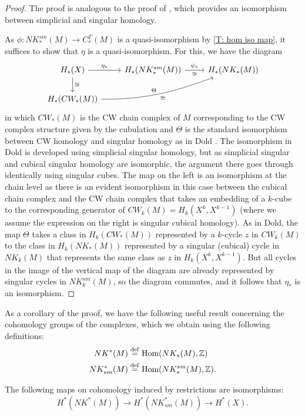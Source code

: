 \begin{proof}
	The proof is analogous to the proof of \cite[Proposition V.8.3]{Dol72}, which provides an isomorphism between simplicial and singular homology.

	As $\phi \colon NK^{sm}_*(M) \to C^\Gamma_*(M)$ is a quasi-isomorphism by \cref{T: hom iso map}, it suffices to show that $\eta$ is a quasi-isomorphism.
	For this, we have the diagram
	\[
	\begin{tikzcd}
		H_*(X) \arrow[r, "\eta_*"] \arrow[d, "\cong"] & H_*(NK^{sm}_*(M)) \arrow[r, "\psi_*", "\cong"'] & H_*(NK_*(M)) \\
		H_*(CW_*(M)) \arrow[rru, "\Theta", "\cong"', out=0, in=200] & &
	\end{tikzcd}
	\]
	in which $CW_*(M)$ is the CW chain complex of $M$ corresponding to the CW complex structure given by the cubulation and $\Theta$ is the standard isomorphism between CW homology and singular homology as in Dold \cite[Proposition V.1.9]{Dol72}.
	The isomorphism in Dold is developed using simplicial singular homology, but as simplicial singular and cubical singular homology are isomorphic, the argument there goes through identically using singular cubes.
	The map on the left is an isomorphism at the chain level as there is an evident isomorphism in this case between the cubical chain complex and the CW chain complex that takes an embedding of a $k$-cube to the corresponding generator of $CW_k(M) = H_k(X^k, X^{k-1})$ (where we assume the expression on the right is singular cubical homology).
	As in Dold, the map $\Theta$ takes a class in $H_k(CW_*(M))$ represented by a $k$-cycle $z$ in $CW_k(M)$ to the class in $H_k(NK_*(M))$ represented by a singular (cubical) cycle in $NK_k(M)$ that represents the same class as $z$ in $H_k(X^k,X^{k-1})$.
	But all cycles in the image of the vertical map of the diagram are already represented by singular cycles in $NK^{sm}_k(M)$, so the diagram commutes, and it follows that $\eta_*$ is an isomorphism.
\end{proof}

As a corollary of the proof, we have the following useful result concerning the cohomology groups of the complexes, which we obtain using the following definitions:
\begin{align*}
	NK^*(M)& \stackrel{\mathrm{def}}{=} \textup{Hom}(NK_*(M),\mathbb{Z})\\
	NK_{sm}^*(M)& \stackrel{\mathrm{def}}{=} \textup{Hom}(NK^{sm}_*(M),\mathbb{Z}).
\end{align*}

\begin{corollary}
	The following maps on cohomology induced by restrictions are isomorphisms: $$H^*(NK^*(M)) \to H^*(NK_{sm}^*(M)) \to H^*(X).$$
\end{corollary}

